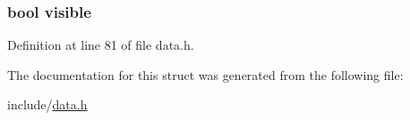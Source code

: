\subsubsection[{\texorpdfstring{visible}{visible}}]{\setlength{\rightskip}{0pt plus 5cm}bool visible}\hypertarget{struct_relation_aa54a57ae048476d840caf6d4d2c47aa3}{}\label{struct_relation_aa54a57ae048476d840caf6d4d2c47aa3}


Definition at line 81 of file data.\+h.



The documentation for this struct was generated from the following file\+:\begin{DoxyCompactItemize}
\item 
include/\hyperlink{data_8h}{data.\+h}\end{DoxyCompactItemize}
